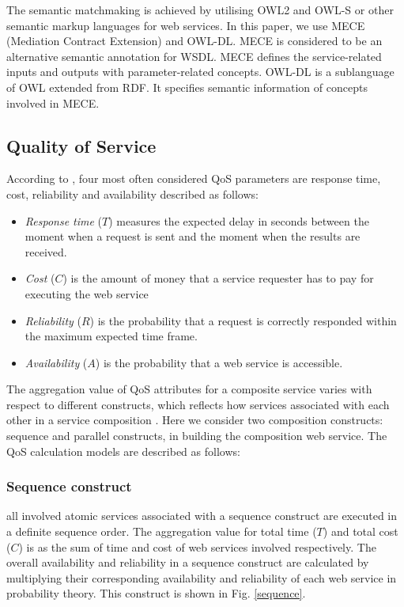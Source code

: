 \documentclass{llncs}
\begin{document}
The semantic matchmaking is achieved by utilising OWL2 and OWL-S or other semantic markup languages for web services. In this paper, we use MECE (Mediation Contract Extension) \cite{bleul2008self} and OWL-DL. MECE is considered to be an alternative semantic annotation for WSDL. MECE defines the service-related inputs and outputs with parameter-related concepts. OWL-DL is a sublanguage of OWL extended from RDF. It specifies semantic information of concepts involved in MECE.


\subsection{Quality of Service}\label{Quality of Service and Composition Constructs}
According to \cite{zeng2003quality}, four most often considered QoS parameters are response time, cost, reliability and availability described as follows:
\begin{itemize}
\item \textit{Response time} ($T$) measures the expected delay in seconds between the moment when a request is sent and the moment when the results are received.
\item \textit{Cost} ($C$) is the amount of money that a service requester has to pay for executing the web service
\item \textit{Reliability} ($R$) is the probability that a request is correctly responded within the maximum expected time frame.
\item \textit{Availability} ($A$) is the probability that a web service is accessible.
\end{itemize}
The aggregation value of QoS attributes for a composite service varies with respect to different constructs, which reflects how services associated with each other in a service composition \cite{zeng2003quality}. Here we consider two composition constructs: sequence and parallel constructs, in building the composition web service. The QoS calculation models are described as follows:
\subsubsection{Sequence construct}
all involved atomic services associated with a sequence construct are executed in a definite sequence order. The aggregation value for total time ($T$) and total cost ($C$) is as the sum of time and cost of web services involved respectively. The overall availability and reliability in a sequence construct are calculated by multiplying their corresponding availability and reliability of each web service in probability theory. This construct is shown in Fig. \ref{sequence}.
\end{document}
